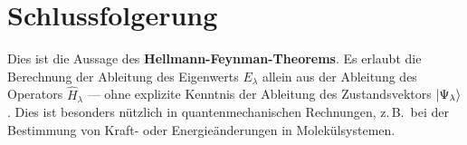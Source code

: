 \documentclass[a4paper,12pt]{scrartcl}
\begin{document}
\section*{Schlussfolgerung}

Dies ist die Aussage des \textbf{Hellmann-Feynman-Theorems}. Es erlaubt die Berechnung der Ableitung des Eigenwerts $E_\lambda$ allein aus der Ableitung des Operators $\hat{H}_\lambda$ — ohne explizite Kenntnis der Ableitung des Zustandsvektors $\ket{\Psi_\lambda}$. Dies ist besonders nützlich in quantenmechanischen Rechnungen, z.\,B.\ bei der Bestimmung von Kraft- oder Energieänderungen in Molekülsystemen.
\end{document}
